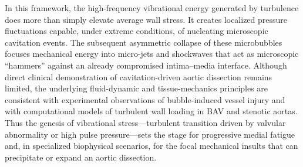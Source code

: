 In this framework, the high-frequency vibrational energy generated by turbulence does more than simply elevate average wall stress. It creates localized pressure fluctuations capable, under extreme conditions, of nucleating microscopic cavitation events. The subsequent asymmetric collapse of these microbubbles focuses mechanical energy into micro-jets and shockwaves that act as microscopic “hammers” against an already compromised intima–media interface. Although direct clinical demonstration of cavitation-driven aortic dissection remains limited, the underlying fluid-dynamic and tissue-mechanics principles are consistent with experimental observations of bubble-induced vessel injury and with computational models of turbulent wall loading in BAV and stenotic aortas. Thus the genesis of vibrational stress—turbulent transition driven by valvular abnormality or high pulse pressure—sets the stage for progressive medial fatigue and, in specialized biophysical scenarios, for the focal mechanical insults that can precipitate or expand an aortic dissection.

